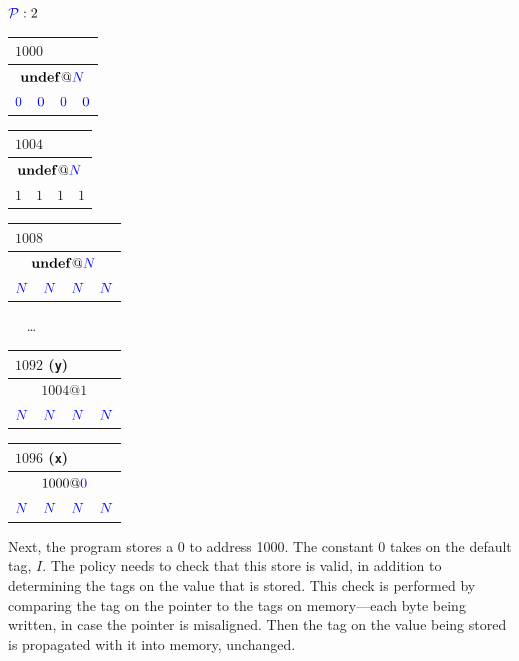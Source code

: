 \documentclass[acmsmall,review,anonymous]{acmart}\settopmatter{printfolios=true,printccs=false,printacmref=false}
\begin{document}
\(\mathcal{\color{blue} P}: 2\)

\vspace{\abovedisplayskip}

\begin{tabular}{|c|c|c|c|}
  \multicolumn{4}{l}{\(1000\)} \\
  \hline
  \multicolumn{4}{|c|}{\(\mathbf{undef} @ {\color{blue} N}\)} \\
  \hline
  \({\color{blue} 0}\) & \({\color{blue} 0}\) & \({\color{blue} 0}\) & \({\color{blue} 0}\) \\
  \hline
\end{tabular}\hspace{-2pt}
\begin{tabular}{|c|c|c|c|}
  \multicolumn{4}{l}{\(1004\)} \\
  \hline
  \multicolumn{4}{|c|}{\(\mathbf{undef} @ {\color{blue} N}\)} \\
  \hline
  \(1\) & \(1\) & \(1\) & \(1\) \\
  \hline
\end{tabular}\hspace{-2pt}
\begin{tabular}{|c|c|c|c|}
  \multicolumn{4}{l}{\(1008\)} \\
  \hline
  \multicolumn{4}{|c|}{\(\mathbf{undef} @ {\color{blue} N}\)} \\
  \hline
  \footnotesize \({\color{blue} N}\) & \footnotesize \({\color{blue} N}\) & \footnotesize \({\color{blue} N}\) & \footnotesize \({\color{blue} N}\) \\
  \hline
\end{tabular}~ ~\dots~ ~
\begin{tabular}{|c|c|c|c|}
  \multicolumn{4}{l}{\(1092\) ({\tt y})} \\
  \hline
  \multicolumn{4}{|c|}{\(1004 @ 1\)} \\
  \hline
  \footnotesize \({\color{blue} N}\) & \footnotesize \({\color{blue} N}\) & \footnotesize \({\color{blue} N}\) & \footnotesize \({\color{blue} N}\) \\
  \hline
\end{tabular}\hspace{-2pt}
\begin{tabular}{|c|c|c|c|}
  \multicolumn{4}{l}{\(1096\) ({\tt x})} \\
  \hline
  \multicolumn{4}{|c|}{\(1000 @ {\color{blue} 0}\)} \\
  \hline
  \footnotesize \({\color{blue} N}\) & \footnotesize \({\color{blue} N}\) & \footnotesize \({\color{blue} N}\) & \footnotesize \({\color{blue} N}\) \\
  \hline
\end{tabular}

\vspace{\belowdisplayskip}

Next, the program stores a 0 to address 1000. The constant 0
takes on the default tag, \(I\). The policy needs to check that
this store is valid, in addition to determining the tags on the value that is stored.
This check is performed by comparing the tag on the pointer to the tags on memory---each
byte being written, in case the pointer is misaligned. Then the tag on the value being stored
is propagated with it into memory, unchanged.
\end{document}
